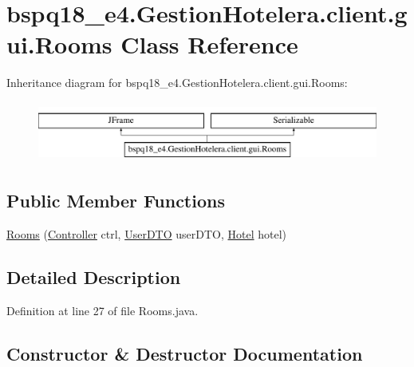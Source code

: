 \hypertarget{classbspq18__e4_1_1_gestion_hotelera_1_1client_1_1gui_1_1_rooms}{}\section{bspq18\+\_\+e4.\+Gestion\+Hotelera.\+client.\+gui.\+Rooms Class Reference}
\label{classbspq18__e4_1_1_gestion_hotelera_1_1client_1_1gui_1_1_rooms}
Inheritance diagram for bspq18\+\_\+e4.\+Gestion\+Hotelera.\+client.\+gui.\+Rooms\+:\begin{figure}[H]
\begin{center}
\leavevmode
\includegraphics[height=2.000000cm]{classbspq18__e4_1_1_gestion_hotelera_1_1client_1_1gui_1_1_rooms}
\end{center}
\end{figure}
\subsection*{Public Member Functions}
\begin{DoxyCompactItemize}
\item 
\mbox{\hyperlink{classbspq18__e4_1_1_gestion_hotelera_1_1client_1_1gui_1_1_rooms_a10f35aa7443d59c6b8310cffbf8585fe}{Rooms}} (\mbox{\hyperlink{classbspq18__e4_1_1_gestion_hotelera_1_1client_1_1controller_1_1_controller}{Controller}} ctrl, \mbox{\hyperlink{classbspq18__e4_1_1_gestion_hotelera_1_1server_1_1dto_1_1_user_d_t_o}{User\+D\+TO}} user\+D\+TO, \mbox{\hyperlink{classbspq18__e4_1_1_gestion_hotelera_1_1server_1_1data_1_1_hotel}{Hotel}} hotel)
\end{DoxyCompactItemize}


\subsection{Detailed Description}


Definition at line 27 of file Rooms.\+java.



\subsection{Constructor \& Destructor Documentation}
\mbox{\label{classbspq18__e4_1_1_gestion_hotelera_1_1client_1_1gui_1_1_rooms_a10f35aa7443d59c6b8310cffbf8585fe}} 
